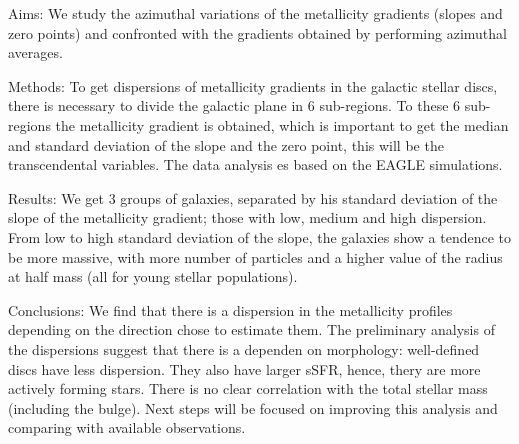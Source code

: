 \documentclass{report}
\begin{document}
Aims: We study the azimuthal variations of the metallicity gradients (slopes and zero points) and confronted with the gradients obtained by performing azimuthal averages.

Methods: To get dispersions of metallicity gradients in the galactic stellar discs, there is necessary to divide the galactic plane in 6 sub-regions. To these 6 sub-regions the metallicity gradient is obtained, which is important to get the median and standard deviation of the slope and the zero point, this will be the transcendental variables. The data analysis es based on the EAGLE simulations.

Results: We get 3 groups of galaxies, separated by his standard deviation of the slope of the metallicity gradient; those with low, medium and high dispersion. From low to high standard deviation of the slope, the galaxies show a tendence to be more massive, with more number of particles and a higher value of the radius at half mass (all for young stellar populations).

Conclusions: We find that there is a dispersion in the metallicity profiles depending on the direction chose to estimate them. The preliminary analysis of the dispersions suggest that there is a dependen on morphology: well-defined discs have less dispersion. They also have larger sSFR, hence, thery are more actively forming stars. There is no clear correlation with the total stellar mass (including the bulge). Next steps will be focused on improving this analysis and comparing with available observations.\newline
\newpage
\end{document}

